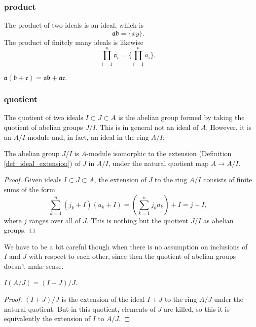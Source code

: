 \documentclass[12pt]{article}
\begin{document}
\subsubsection{product}

The product of two ideals is an ideal, which is 
\begin{equation*}
	\mathfrak{a}\mathfrak{b} = \{xy\}.
\end{equation*}
The product of finitely many ideals is likewise 
\begin{equation*}
	\prod_{i=1}^n \mathfrak{a}_i = \{ \prod_{i=1}^n a_i \}.
\end{equation*}

\begin{proposition}
	$\mathfrak{a}(\mathfrak{b} + \mathfrak{c}) = \mathfrak{a}\mathfrak{b} + \mathfrak{a}\mathfrak{c}$.
\end{proposition}

\subsubsection{quotient}

The quotient of two ideals $I\subset J\subset A$ is the abelian group formed by taking the quotient of abelian groups $J/I$. This is in general not an ideal of $A$. However, it is an $A/I$-module and, in fact, an ideal in the ring $A/I$:

\begin{proposition}
\label{prop_quotient_ideals_is_extension_and_abelian_quotient}
	The abelian group $J/I$ is $A$-module isomorphic to the extension (Definition \ref{def_ideal_extension}) of $J$ in $A/I$, under the natural quotient map $A\to A/I$.
\end{proposition} 
\begin{proof}
	Given ideals $I\subset J\subset A$, the extension of $J$ to the ring $A/I$ consists of finite sums of the form 
	\begin{equation*}
		\sum_{k=1}^n (j_k + I)(a_k + I) = (\sum_{k=1}^n j_ka_k) + I = j+I,
	\end{equation*}
	where $j$ ranges over all of $J$. This is nothing but the quotient $J/I$ as abelian groups. 
\end{proof}

We have to be a bit careful though when there is no assumption on inclusions of $I$ and $J$ with respect to each other, since then the quotient of abelian groups doesn't make sense.

\begin{corollary}
\label{cor_ij_iaj_iplusjj}
	$I(A/J) = (I+J)/J$.
\end{corollary}
\begin{proof}
	$(I+J)/J$ is the extension of the ideal $I+J$ to the ring $A/J$ under the natural quotient. But in this quotient, elements of $J$ are killed, so this it is equivalently the extension of $I$ to $A/J$.
\end{proof}
\end{document}
